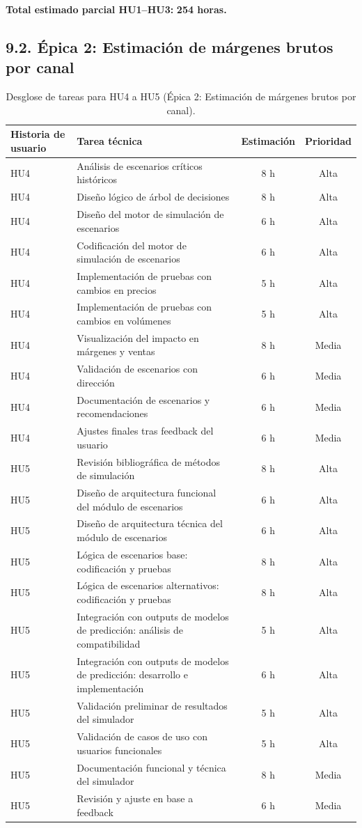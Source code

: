 \documentclass[
11pt, %
]{charter}
\begin{document}
\vspace{0.2cm}
\noindent
\textbf{Total estimado parcial HU1–HU3:} \textbf{254 horas.}

\subsection*{9.2. Épica 2: Estimación de márgenes brutos por canal}

\begin{table}[H]
\centering
\begin{tabular}{|l|p{6cm}|c|c|}
\hline
\textbf{Historia de usuario} & \textbf{Tarea técnica} & \textbf{Estimación} & \textbf{Prioridad} \\
\hline
HU4 & Análisis de escenarios críticos históricos & 8 h & Alta \\
HU4 & Diseño lógico de árbol de decisiones & 8 h & Alta \\
HU4 & Diseño del motor de simulación de escenarios & 6 h & Alta \\
HU4 & Codificación del motor de simulación de escenarios & 6 h & Alta \\
HU4 & Implementación de pruebas con cambios en precios & 5 h & Alta \\
HU4 & Implementación de pruebas con cambios en volúmenes & 5 h & Alta \\
HU4 & Visualización del impacto en márgenes y ventas & 8 h & Media \\
HU4 & Validación de escenarios con dirección & 6 h & Media \\
HU4 & Documentación de escenarios y recomendaciones & 6 h & Media \\
HU4 & Ajustes finales tras feedback del usuario & 6 h & Media \\
\hline
HU5 & Revisión bibliográfica de métodos de simulación & 8 h & Alta \\
HU5 & Diseño de arquitectura funcional del módulo de escenarios & 6 h & Alta \\
HU5 & Diseño de arquitectura técnica del módulo de escenarios & 6 h & Alta \\
HU5 & Lógica de escenarios base: codificación y pruebas & 8 h & Alta \\
HU5 & Lógica de escenarios alternativos: codificación y pruebas & 8 h & Alta \\
HU5 & Integración con outputs de modelos de predicción: análisis de compatibilidad & 5 h & Alta \\
HU5 & Integración con outputs de modelos de predicción: desarrollo e implementación & 6 h & Alta \\
HU5 & Validación preliminar de resultados del simulador & 5 h & Alta \\
HU5 & Validación de casos de uso con usuarios funcionales & 5 h & Alta \\
HU5 & Documentación funcional y técnica del simulador & 8 h & Media \\
HU5 & Revisión y ajuste en base a feedback & 6 h & Media \\
\hline
\end{tabular}
\caption{Desglose de tareas para HU4 a HU5 (Épica 2: Estimación de márgenes brutos por canal).}
\end{table}
\end{document}
